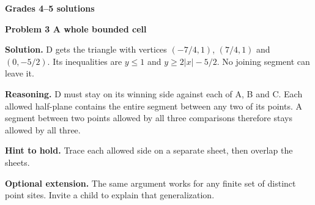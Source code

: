 \documentclass[letterpaper,11pt]{article}
\begin{document}
\vspace{.15in}
\newpage
{\Large\bfseries Grades 4--5 solutions}\par
\vspace{.08in}
{\large\bfseries Problem 3 A whole bounded cell}\par
\vspace{3pt}
\noindent\begin{minipage}[t]{.58\textwidth}\vspace{0pt}
\fontsize{10.8}{13.2}\selectfont
\textbf{Solution.} D gets the triangle with vertices $(-7/4,1)$, $(7/4,1)$ and $(0,-5/2)$. Its inequalities are $y\leq1$ and $y\geq2|x|-5/2$. No joining segment can leave it.

\textbf{Reasoning.} D must stay on its winning side against each of A, B and C. Each allowed half-plane contains the entire segment between any two of its points. A segment between two points allowed by all three comparisons therefore stays allowed by all three.

\textbf{Hint to hold.} Trace each allowed side on a separate sheet, then overlap the sheets.

\textbf{Optional extension.} The same argument works for any finite set of distinct point sites. Invite a child to explain that generalization.
\end{minipage}\hfill\begin{minipage}[t]{.40\textwidth}\vspace{0pt}\centering
{}
\end{minipage}
\end{document}
